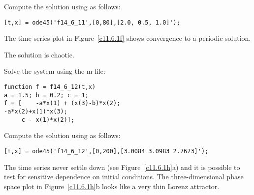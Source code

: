 \documentclass{ximera}
\begin{document}
Compute the solution using \Matlab as follows:
\begin{verbatim}
[t,x] = ode45('f14_6_11',[0,80],[2.0, 0.5, 1.0]');
\end{verbatim}
The time series plot in Figure~\ref{c11.6.1f} shows convergence to a periodic solution.  

\begin{figure}[htb]
     \centerline{%
     }
\end{figure} 

 \ans The solution is chaotic.

\soln Solve the system using the m-file:
\begin{verbatim}
function f = f14_6_12(t,x)
a = 1.5; b = 0.2; c = 1;
f = [    -a*x(1) + (x(3)-b)*x(2);
-a*x(2)+x(1)*x(3);   
     c - x(1)*x(2)];
\end{verbatim}

Compute the solution using \Matlab as follows:
\begin{verbatim}
[t,x] = ode45('f14_6_12',[0,200],[3.0084 3.0983 2.7673]');
\end{verbatim}
The time series never settle down (see Figure~\ref{c11.6.1h}a) and it is 
possible to test for sensitive dependence on initial conditions. 
The three-dimensional phase space plot in Figure~\ref{c11.6.1h}b looks like 
a very thin Lorenz attractor.  

\begin{figure}[htb]
     \centerline{%
     }
\end{figure} 
\end{document}
